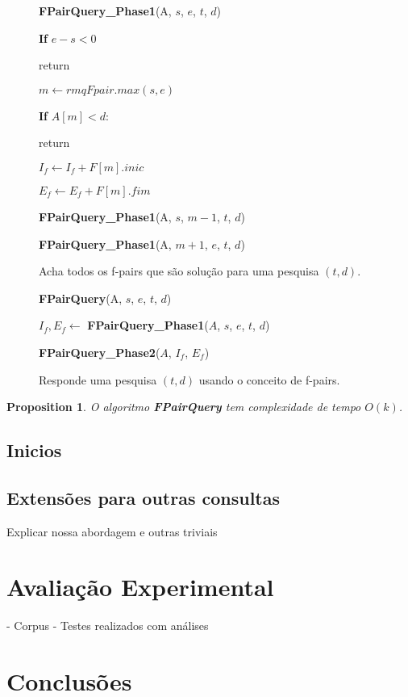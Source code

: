 \documentclass[12pt]{article}
\newtheorem{prop}[thm]{Proposition}
\begin{document}
\clearpage
\begin{figure}
\begin{framed}
{\bf FPairQuery\_Phase1}(A, $s$, $e$, $t$, $d$)

\hspace{1cm} {\bf If} $e - s < 0$

\hspace{2cm} return

\hspace{1cm} $m \leftarrow rmqFpair.max(s, e)$

\hspace{1cm} {\bf If} $A[m] < d$:

\hspace{2cm} return

\hspace{1cm} $I_f \leftarrow I_f + F[m].inic$

\hspace{1cm} $E_f \leftarrow E_f + F[m].fim$

\hspace{1cm} {\bf FPairQuery\_Phase1}(A, $s$, $m - 1$, $t$, $d$)

\hspace{1cm} {\bf FPairQuery\_Phase1}(A, $m + 1$, $e$, $t$, $d$)

\caption{Acha todos os f-pairs que são solução para uma pesquisa $(t, d)$.}
\label{fpairqueryphase1}
\end{framed}
\end{figure}


\begin{figure}
\begin{framed}
{\bf FPairQuery}(A, $s$, $e$, $t$, $d$)

\hspace{1cm} $I_f, E_f \leftarrow$ {\bf FPairQuery\_Phase1}($A$, $s$, $e$, $t$, $d$)

\hspace{1cm} {\bf FPairQuery\_Phase2}($A$, $I_f$, $E_f$)

\caption{Responde uma pesquisa $(t, d)$ usando o conceito de f-pairs.}
\label{fpairquery}
\end{framed}
\end{figure}

\begin{prop}
O algoritmo {\bf FPairQuery} tem complexidade de tempo $O(k)$.
\end{prop}

\subsection{Inicios}
\subsection{Extensões para outras consultas}
 Explicar nossa abordagem e outras triviais

\section{Avaliação Experimental}
- Corpus
- Testes realizados com análises

\section{Conclusões}




\end{document}
